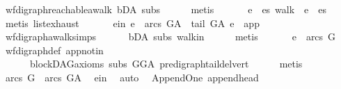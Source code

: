\begin{isabellebody}
\ wf{\isacharunderscore}{\kern0pt}digraph{\isachardot}{\kern0pt}reachable{}{\isacharunderscore}{\kern0pt}awalk\ bD{\isacharunderscore}{\kern0pt}A\ subs\isanewline
\ \ \ \ \isamarkupfalse%
\ metis\ \isanewline
\ \ \isamarkupfalse%
\ \isamarkupfalse%
\ e\ \ {\isachardoublequoteopen}{\isasymexists}es{\isachardot}{\kern0pt}\ walk\ {\isacharequal}{\kern0pt}\ e\ {\isacharhash}{\kern0pt}\ es{\isachardoublequoteclose}\isanewline
\ \ \ \ \isamarkupfalse%
\ {\isacharparenleft}{\kern0pt}metis\ list{\isachardot}{\kern0pt}exhaust{\isacharparenright}{\kern0pt}\ \isanewline
\ \ \isamarkupfalse%
\ \isamarkupfalse%
\ e{\isacharunderscore}{\kern0pt}in{\isacharcolon}{\kern0pt}\ {\isachardoublequoteopen}e\ {\isasymin}\ arcs\ G{\isacharunderscore}{\kern0pt}A\ {\isasymand}\ tail\ G{\isacharunderscore}{\kern0pt}A\ e\ {\isacharequal}{\kern0pt}\ app{\isachardoublequoteclose}\isanewline
\ \ \ \ \isamarkupfalse%
\ wf{\isacharunderscore}{\kern0pt}digraph{\isachardot}{\kern0pt}awalk{\isacharunderscore}{\kern0pt}simps{\isacharparenleft}{\kern0pt}{}{\isacharparenright}{\kern0pt}\isanewline
\ \ \ \ \ \ bD{\isacharunderscore}{\kern0pt}A\ subs\ walk{\isacharunderscore}{\kern0pt}in\isanewline
\ \ \ \ \isamarkupfalse%
\ metis\ \isanewline
\ \ \isamarkupfalse%
\ \isamarkupfalse%
\ {\isachardoublequoteopen}e\ {\isasymnotin}\ arcs\ G{\isachardoublequoteclose}\ \isamarkupfalse%
\ wf{\isacharunderscore}{\kern0pt}digraph{\isacharunderscore}{\kern0pt}def\ app{\isacharunderscore}{\kern0pt}notin\ \isanewline
\ \ \ \ \ \ blockDAG{\isacharunderscore}{\kern0pt}axioms\ subs\ GG{\isacharunderscore}{\kern0pt}A\ pre{\isacharunderscore}{\kern0pt}digraph{\isachardot}{\kern0pt}tail{\isacharunderscore}{\kern0pt}del{\isacharunderscore}{\kern0pt}vert\isanewline
\ \ \ \ \isamarkupfalse%
\ metis\ \isanewline
\ \ \isamarkupfalse%
\ \isamarkupfalse%
\ {\isachardoublequoteopen}arcs\ G\ {\isasymnoteq}\ arcs\ G{\isacharunderscore}{\kern0pt}A{\isachardoublequoteclose}\ \isamarkupfalse%
\ e{\isacharunderscore}{\kern0pt}in\ \isamarkupfalse%
\ auto\isanewline
{}\isamarkupfalse%
%
\endisatagproof
{\isafoldproof}%
%
\isadelimproof
\isanewline
%
\endisadelimproof
\isanewline
{}\isamarkupfalse%
\ {\isacharparenleft}{\kern0pt}\ Append{\isacharunderscore}{\kern0pt}One{\isacharparenright}{\kern0pt}\ append{\isacharunderscore}{\kern0pt}head{\isacharcolon}{\kern0pt}\ \isanewline

\end{isabellebody}
